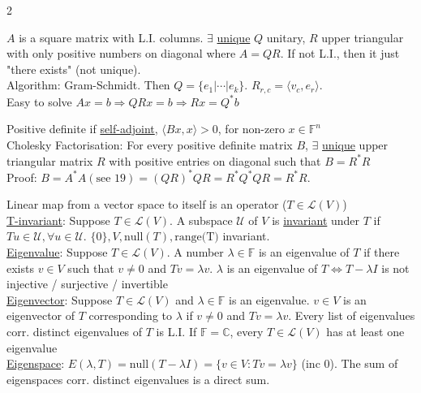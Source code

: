 \documentclass[a4paper,8pt]{extarticle} %
\newcommand{\mybox}[2]{
    \begin{tcolorbox}[colback=lightblue!5!white,colframe=lightblue!75!black,boxsep=1pt,arc=0pt,outer arc=0pt,coltext=black,title={\textcolor{black}{#1}}, before skip=2pt, after skip=2pt]
        #2
    \end{tcolorbox}
}
\begin{document}
\begin{multicols*}{2}
\mybox{QR Factorisation}{
$A$ is a square matrix with L.I. columns. $\exists$ \underline{unique} $Q$ unitary, $R$ upper triangular with only positive numbers on diagonal where $A = QR$. If not L.I., then it just "there exists" (not unique).\\

Algorithm: Gram-Schmidt. Then $Q = \{e_1|\cdots|e_k \}$. $R_{r, c}=\langle v_c, e_r\rangle$.\\

Easy to solve $Ax =b \Rightarrow QRx=b\Rightarrow Rx=Q^{*}b$
}

\mybox{Cholesky Factorisation}{
Positive definite if \underline{self-adjoint}, $\langle Bx, x\rangle>0$, for non-zero $x\in \mathbb{F}^{n}$\\

Cholesky Factorisation: For every positive definite matrix $B$, $\exists$ \underline{unique} upper triangular matrix $R$ with positive entries on diagonal such that $B = R^{*}R$\\

Proof: $B = A^{*}A (\text{see }19)=(QR)^{*}QR=R^{*}Q^{*}QR=R^{*}R$.
}

\mybox{Invariant Subspaces}{
Linear map from a vector space to itself is an operator ($T\in\mathcal{L}(V)$)\\

\underline{T-invariant}: Suppose $T \in \mathcal{L}(V)$. A subspace $\mathcal{U}$ of $V$ is \underline{invariant} under $T$ if $Tu\in \mathcal{U}, \forall u\in \mathcal{U}$. $\{0\}, V, \text{null}(T), \text{range(T)}$ invariant.\\

\underline{Eigenvalue}: Suppose $T \in \mathcal{L}(V)$. A number $\lambda\in\mathbb{F}$ is an eigenvalue of $T$ if there exists $v\in V$ such that $v \neq 0$ and $Tv=\lambda v$. $\lambda$ is an eigenvalue of $T \Leftrightarrow T-\lambda I$ is not injective / surjective / invertible\\

\underline{Eigenvector}: Suppose $T\in\mathcal{L}(V)$ and $\lambda \in \mathbb{F}$ is an eigenvalue. $v\in V$ is an eigenvector of $T$ corresponding to $\lambda$ if $v \neq 0$ and $Tv=\lambda v$. Every list of eigenvalues corr. distinct eigenvalues of $T$ is L.I. If $\mathbb{F}=\mathbb{C}$, every $T \in \mathcal{L}(V)$ has at least one eigenvalue\\

\underline{Eigenspace}: $E(\lambda, T)=\text{null}(T-\lambda I)=\{v\in V : Tv=\lambda v\}$ (inc $0$). The sum of eigenspaces corr. distinct eigenvalues is a direct sum.
}


\end{multicols*}
\end{document}
